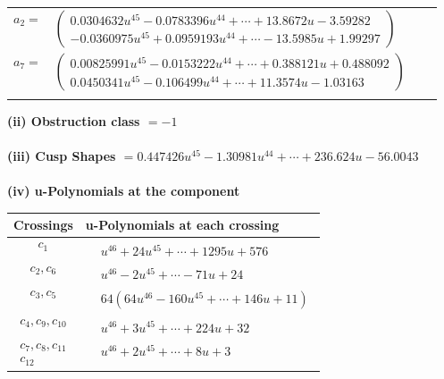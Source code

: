 \documentclass[1p]{elsarticle_modified}
\theoremstyle{definition}
\begin{document}
\begin{tabular}{m{7pt} m{180pt} m{7pt} m{180pt} }
\flushright $a_{2}=$&$\begin{pmatrix}0.0304632 u^{45}-0.0783396 u^{44}+\cdots+13.8672 u-3.59282\\-0.0360975 u^{45}+0.0959193 u^{44}+\cdots-13.5985 u+1.99297\end{pmatrix}$ \\
\flushright $a_{7}=$&$\begin{pmatrix}0.00825991 u^{45}-0.0153222 u^{44}+\cdots+0.388121 u+0.488092\\0.0450341 u^{45}-0.106499 u^{44}+\cdots+11.3574 u-1.03163\end{pmatrix}$\\&\end{tabular}
\flushleft \textbf{(ii) Obstruction class $= -1$}\\~\\
\flushleft \textbf{(iii) Cusp Shapes $= 0.447426 u^{45}-1.30981 u^{44}+\cdots+236.624 u-56.0043$}\\~\\
\newpage\renewcommand{\arraystretch}{1}
\flushleft \textbf{(iv) u-Polynomials at the component}\newline \\
\begin{tabular}{m{50pt}|m{274pt}}
Crossings & \hspace{64pt}u-Polynomials at each crossing \\
\hline $$\begin{aligned}c_{1}\end{aligned}$$&$\begin{aligned}
&u^{46}+24 u^{45}+\cdots+1295 u+576
\end{aligned}$\\
\hline $$\begin{aligned}c_{2},c_{6}\end{aligned}$$&$\begin{aligned}
&u^{46}-2 u^{45}+\cdots-71 u+24
\end{aligned}$\\
\hline $$\begin{aligned}c_{3},c_{5}\end{aligned}$$&$\begin{aligned}
&64(64 u^{46}-160 u^{45}+\cdots+146 u+11)
\end{aligned}$\\
\hline $$\begin{aligned}c_{4},c_{9},c_{10}\end{aligned}$$&$\begin{aligned}
&u^{46}+3 u^{45}+\cdots+224 u+32
\end{aligned}$\\
\hline $$\begin{aligned}c_{7},c_{8},c_{11}\\c_{12}\end{aligned}$$&$\begin{aligned}
&u^{46}+2 u^{45}+\cdots+8 u+3
\end{aligned}$\\
\hline
\end{tabular}\\~\\
\end{document}
